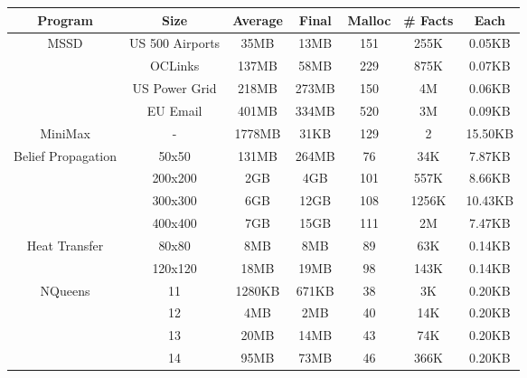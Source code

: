 \begin{tabular}{c | c || c | c | c || c c} \hline
	\textbf{Program} & \textbf{Size} & \textbf{Average} & \textbf{Final} & \textbf{Malloc} & \textbf{\# Facts} & \textbf{Each} \\ \hline \hline
	\multirow{4}{*}{MSSD}  & US 500 Airports & 35MB & 13MB & 151 & 255K & 0.05KB \\
		 & OCLinks & 137MB & 58MB & 229 & 875K & 0.07KB \\
		 & US Power Grid & 218MB & 273MB & 150 & 4M & 0.06KB \\
		 & EU Email & 401MB & 334MB & 520 & 3M & 0.09KB \\
	\hline
	MiniMax  & - & 1778MB & 31KB & 129 & 2 & 15.50KB \\
	\hline
	\multirow{4}{*}{Belief Propagation}  & 50x50 & 131MB & 264MB & 76 & 34K & 7.87KB \\
		 & 200x200 & 2GB & 4GB & 101 & 557K & 8.66KB \\
		 & 300x300 & 6GB & 12GB & 108 & 1256K & 10.43KB \\
		 & 400x400 & 7GB & 15GB & 111 & 2M & 7.47KB \\
	\hline
	\multirow{2}{*}{Heat Transfer}  & 80x80 & 8MB & 8MB & 89 & 63K & 0.14KB \\
		 & 120x120 & 18MB & 19MB & 98 & 143K & 0.14KB \\
	\hline
	\multirow{4}{*}{NQueens}  & 11 & 1280KB & 671KB & 38 & 3K & 0.20KB \\
		 & 12 & 4MB & 2MB & 40 & 14K & 0.20KB \\
		 & 13 & 20MB & 14MB & 43 & 74K & 0.20KB \\
		 & 14 & 95MB & 73MB & 46 & 366K & 0.20KB \\
	\hline
\end{tabular}
